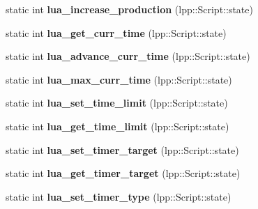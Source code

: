 \begin{DoxyCompactItemize}
\item 
static int {\bfseries lua\+\_\+increase\+\_\+production} (lpp\+::\+Script\+::state)\hypertarget{class_lua_interface_a6e68682ad7d914b44017cc275b250a19}{}\label{class_lua_interface_a6e68682ad7d914b44017cc275b250a19}

\item 
static int {\bfseries lua\+\_\+get\+\_\+curr\+\_\+time} (lpp\+::\+Script\+::state)\hypertarget{class_lua_interface_a268d69c29f702861a0e10c61ce845b68}{}\label{class_lua_interface_a268d69c29f702861a0e10c61ce845b68}

\item 
static int {\bfseries lua\+\_\+advance\+\_\+curr\+\_\+time} (lpp\+::\+Script\+::state)\hypertarget{class_lua_interface_acdbfed26e47ee72982d6fdc31668062a}{}\label{class_lua_interface_acdbfed26e47ee72982d6fdc31668062a}

\item 
static int {\bfseries lua\+\_\+max\+\_\+curr\+\_\+time} (lpp\+::\+Script\+::state)\hypertarget{class_lua_interface_a31e57f836ab6338fbe980a79277d3754}{}\label{class_lua_interface_a31e57f836ab6338fbe980a79277d3754}

\item 
static int {\bfseries lua\+\_\+set\+\_\+time\+\_\+limit} (lpp\+::\+Script\+::state)\hypertarget{class_lua_interface_a3e34bb9c8dfb23ca2cd17a3d2c023dac}{}\label{class_lua_interface_a3e34bb9c8dfb23ca2cd17a3d2c023dac}

\item 
static int {\bfseries lua\+\_\+get\+\_\+time\+\_\+limit} (lpp\+::\+Script\+::state)\hypertarget{class_lua_interface_a2c62c05a23264df8d6a674f336e24d6c}{}\label{class_lua_interface_a2c62c05a23264df8d6a674f336e24d6c}

\item 
static int {\bfseries lua\+\_\+set\+\_\+timer\+\_\+target} (lpp\+::\+Script\+::state)\hypertarget{class_lua_interface_a9936ac9245f9afbd0f92d83a88df1ee6}{}\label{class_lua_interface_a9936ac9245f9afbd0f92d83a88df1ee6}

\item 
static int {\bfseries lua\+\_\+get\+\_\+timer\+\_\+target} (lpp\+::\+Script\+::state)\hypertarget{class_lua_interface_a9582a37f9ce095702d8cacbdec6b63f7}{}\label{class_lua_interface_a9582a37f9ce095702d8cacbdec6b63f7}

\item 
static int {\bfseries lua\+\_\+set\+\_\+timer\+\_\+type} (lpp\+::\+Script\+::state)\hypertarget{class_lua_interface_ab21236291b53d374b9e72473afb0bb01}{}\label{class_lua_interface_ab21236291b53d374b9e72473afb0bb01}


\end{DoxyCompactItemize}
